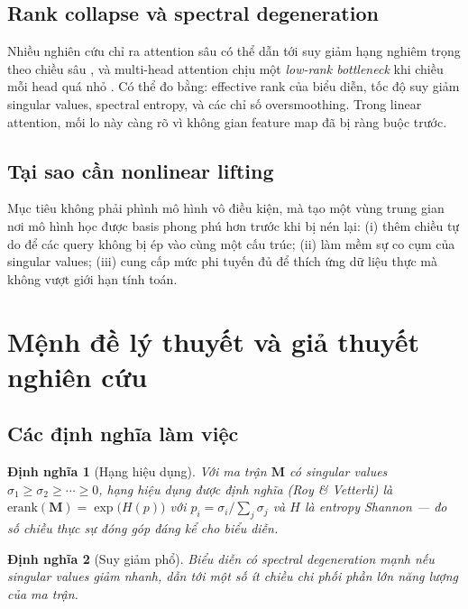 \documentclass[12pt,a4paper]{article}
\newtheorem{definition}{Định nghĩa}[section]
\begin{document}
\subsection{Rank collapse và spectral degeneration}
Nhiều nghiên cứu chỉ ra attention sâu có thể dẫn tới suy giảm hạng nghiêm trọng theo chiều sâu
\cite{dong2021rankcollapse}, và multi-head attention chịu một \emph{low-rank bottleneck} khi chiều
mỗi head quá nhỏ \cite{bhojanapalli2020low}. Có thể đo bằng: effective rank của biểu diễn, tốc độ
suy giảm singular values, spectral entropy, và các chỉ số oversmoothing. Trong linear attention,
mối lo này càng rõ vì không gian feature map đã bị ràng buộc trước.

\subsection{Tại sao cần nonlinear lifting}
Mục tiêu không phải phình mô hình vô điều kiện, mà tạo một vùng trung gian nơi mô hình học được
basis phong phú hơn trước khi bị nén lại: (i) thêm chiều tự do để các query không bị ép vào cùng
một cấu trúc; (ii) làm mềm sự co cụm của singular values; (iii) cung cấp mức phi tuyến đủ để thích
ứng dữ liệu thực mà không vượt giới hạn tính toán.

\section{Mệnh đề lý thuyết và giả thuyết nghiên cứu}

\subsection{Các định nghĩa làm việc}
\begin{definition}[Hạng hiệu dụng]
Với ma trận $\mathbf{M}$ có singular values $\sigma_1 \geq \sigma_2 \geq \cdots \geq 0$, hạng hiệu
dụng được định nghĩa (Roy \& Vetterli) là $\mathrm{erank}(\mathbf{M}) = \exp\!\big(H(p)\big)$ với
$p_i = \sigma_i / \sum_j \sigma_j$ và $H$ là entropy Shannon --- đo số chiều thực sự đóng góp đáng
kể cho biểu diễn.
\end{definition}

\begin{definition}[Suy giảm phổ]
Biểu diễn có spectral degeneration mạnh nếu singular values giảm nhanh, dẫn tới một số ít chiều chi
phối phần lớn năng lượng của ma trận.
\end{definition}
\end{document}
